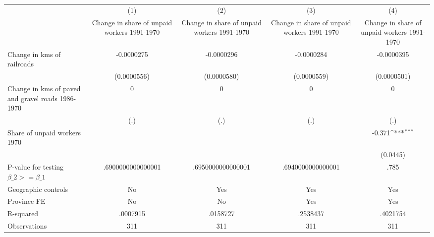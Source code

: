 {
\def\sym#1{\ifmmode^{#1}\else\(^{#1}\)\fi}
\begin{tabular}{l*{4}{c}}
\hline\hline
                &\multicolumn{1}{c}{(1)}&\multicolumn{1}{c}{(2)}&\multicolumn{1}{c}{(3)}&\multicolumn{1}{c}{(4)}\\
                &\multicolumn{1}{c}{Change in share of unpaid workers 1991-1970}&\multicolumn{1}{c}{Change in share of unpaid workers 1991-1970}&\multicolumn{1}{c}{Change in share of unpaid workers 1991-1970}&\multicolumn{1}{c}{Change in share of unpaid workers 1991-1970}\\
\hline
Change in kms of railroads&-0.0000275         &-0.0000296         &-0.0000284         &-0.0000395         \\
                &(0.0000556)         &(0.0000580)         &(0.0000559)         &(0.0000501)         \\
[1em]
Change in kms of paved and gravel roads 1986-1970&        0         &        0         &        0         &        0         \\
                &      (.)         &      (.)         &      (.)         &      (.)         \\
[1em]
Share of unpaid workers 1970&                  &                  &                  &   -0.371\sym{***}\\
                &                  &                  &                  & (0.0445)         \\
\hline
P-value for testing $\beta\_{2} >= \beta\_{1}$&.6900000000000001         &.6950000000000001         &.6940000000000001         &     .785         \\
Geographic controls&       No         &      Yes         &      Yes         &      Yes         \\
Province FE     &       No         &       No         &      Yes         &      Yes         \\
R-squared       & .0007915         & .0158727         & .2538437         & .4021754         \\
Observations    &      311         &      311         &      311         &      311         \\
\hline\hline
\end{tabular}
}
